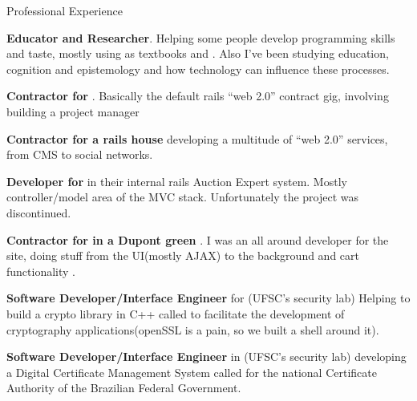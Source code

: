 \begin{rubric}{Professional Experience}{
    

    \entry*[2009]%
        \textbf{Educator and Researcher}. Helping some people develop 
        programming skills and taste, mostly using as textbooks
         and
        .
        Also I've been studying education, cognition and epistemology and how
        technology can influence these processes. 

    \entry*[2009]%
        \textbf{Contractor for
        }. Basically the
        default rails ``web 2.0'' contract gig, involving building a project
        manager

    \entry*[2007 - 2008]%
        \textbf{Contractor for  a rails house} 
        developing a multitude of ``web 2.0'' services, from CMS to social networks.

    \entry*[2007]%
        \textbf{Developer for } 
        in their internal rails Auction Expert system. Mostly controller/model area of
        the MVC stack. Unfortunately the project was discontinued.

    \entry*[2007]%
        \textbf{Contractor for  
        in a Dupont green }.
        I was an all around developer for the site, doing stuff from the
        UI(mostly AJAX) to the background and cart functionality .

    \entry*[2005 - 2007]%
        \textbf{Software Developer/Interface Engineer} for 
        (UFSC's security lab) Helping
        to build a crypto library in C++ called  
        to facilitate the development of cryptography
        applications(openSSL is a pain, so we built a shell around it).

    \entry*[2005 - 2007]%
        \textbf{Software Developer/Interface Engineer} in 
        (UFSC's security lab) developing a
        Digital Certificate Management System  called
         for the national
        Certificate Authority of the Brazilian Federal Government.

        
}\end{rubric}

